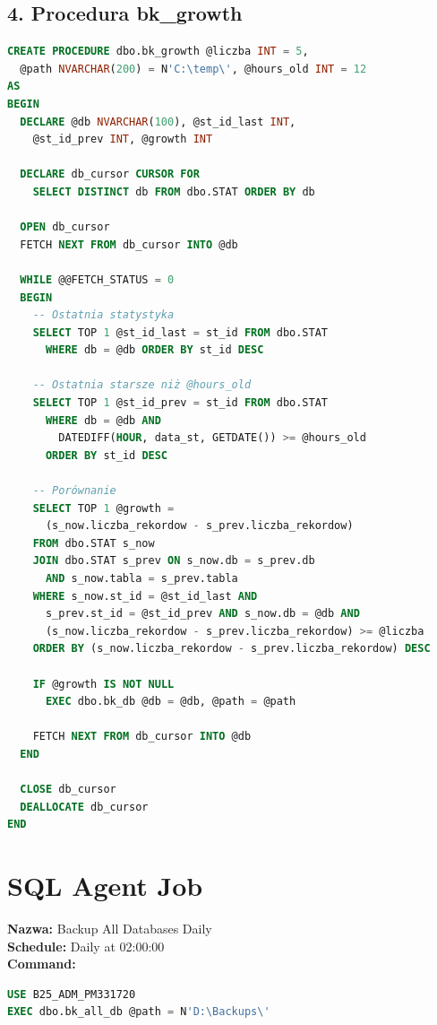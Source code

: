 \documentclass[a4paper,10pt]{article}
\begin{document}
	\subsection{4. Procedura bk\_growth}
	\begin{lstlisting}[language=SQL]
CREATE PROCEDURE dbo.bk_growth @liczba INT = 5,
  @path NVARCHAR(200) = N'C:\temp\', @hours_old INT = 12
AS
BEGIN
  DECLARE @db NVARCHAR(100), @st_id_last INT, 
    @st_id_prev INT, @growth INT
  
  DECLARE db_cursor CURSOR FOR
    SELECT DISTINCT db FROM dbo.STAT ORDER BY db
  
  OPEN db_cursor
  FETCH NEXT FROM db_cursor INTO @db
  
  WHILE @@FETCH_STATUS = 0
  BEGIN
    -- Ostatnia statystyka
    SELECT TOP 1 @st_id_last = st_id FROM dbo.STAT 
      WHERE db = @db ORDER BY st_id DESC
    
    -- Ostatnia starsze niż @hours_old
    SELECT TOP 1 @st_id_prev = st_id FROM dbo.STAT
      WHERE db = @db AND 
        DATEDIFF(HOUR, data_st, GETDATE()) >= @hours_old
      ORDER BY st_id DESC
    
    -- Porównanie
    SELECT TOP 1 @growth = 
      (s_now.liczba_rekordow - s_prev.liczba_rekordow)
    FROM dbo.STAT s_now
    JOIN dbo.STAT s_prev ON s_now.db = s_prev.db 
      AND s_now.tabla = s_prev.tabla
    WHERE s_now.st_id = @st_id_last AND 
      s_prev.st_id = @st_id_prev AND s_now.db = @db AND
      (s_now.liczba_rekordow - s_prev.liczba_rekordow) >= @liczba
    ORDER BY (s_now.liczba_rekordow - s_prev.liczba_rekordow) DESC
    
    IF @growth IS NOT NULL
      EXEC dbo.bk_db @db = @db, @path = @path
    
    FETCH NEXT FROM db_cursor INTO @db
  END
  
  CLOSE db_cursor
  DEALLOCATE db_cursor
END
	\end{lstlisting}
	
	\section{SQL Agent Job}
	
	\textbf{Nazwa:} Backup All Databases Daily\\
	\textbf{Schedule:} Daily at 02:00:00\\
	\textbf{Command:}
	\begin{lstlisting}[language=SQL]
USE B25_ADM_PM331720
EXEC dbo.bk_all_db @path = N'D:\Backups\'
	\end{lstlisting}
	
\end{document}
